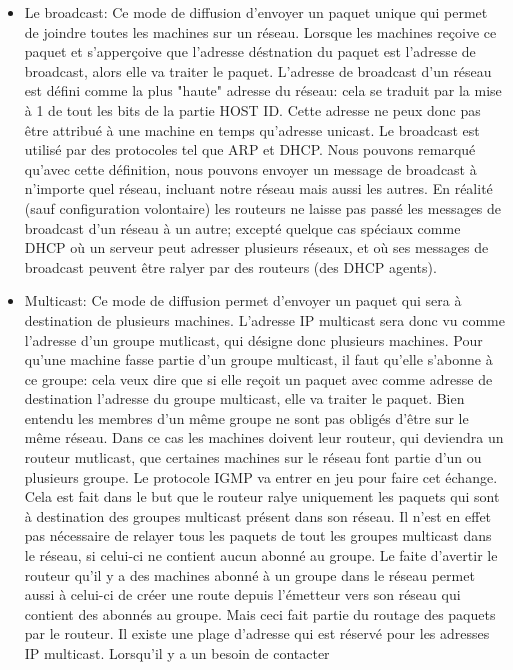 \begin{itemize}
\item Le broadcast: Ce mode de diffusion d'envoyer un paquet unique qui permet
de joindre toutes les machines sur un réseau. Lorsque les machines reçoive ce
paquet et s'apperçoive que l'adresse déstnation du paquet est l'adresse de
broadcast, alors elle va traiter le paquet. L'adresse de broadcast d'un réseau
est défini comme la plus "haute" adresse du réseau: cela se traduit par la mise
à 1 de tout les bits de la partie HOST ID. Cette adresse ne peux donc pas être
attribué à une machine en temps qu'adresse unicast.  Le broadcast est utilisé
par des protocoles tel que ARP et DHCP.  Nous pouvons remarqué qu'avec cette
définition, nous pouvons envoyer un message de broadcast à n'importe quel
réseau, incluant notre réseau mais aussi les autres. En réalité (sauf
configuration volontaire) les routeurs ne laisse pas passé les messages de
broadcast d'un réseau à un autre; excepté quelque cas spéciaux comme DHCP où un
serveur peut adresser plusieurs réseaux, et où ses messages de broadcast
peuvent être ralyer par des routeurs (des DHCP agents).
\item Multicast: Ce mode de diffusion permet d'envoyer un paquet qui sera à destination
de plusieurs machines. L'adresse IP multicast sera donc vu comme l'adresse d'un groupe
mutlicast, qui désigne donc plusieurs machines. Pour qu'une machine fasse partie d'un
groupe multicast, il faut qu'elle s'abonne à ce groupe: cela veux dire que si elle reçoit
un paquet avec comme adresse de destination l'adresse du groupe multicast, elle va traiter
le paquet.
Bien entendu les membres d'un même groupe ne sont pas obligés d'être sur le même réseau. Dans ce
cas les machines doivent leur routeur, qui deviendra un routeur mutlicast, que certaines machines sur
le réseau font partie d'un ou plusieurs groupe. Le protocole IGMP va entrer en jeu pour faire cet échange.
Cela est fait dans le but que le routeur ralye uniquement les paquets qui sont à destination des groupes
multicast  présent dans son réseau. Il n'est en effet pas nécessaire de relayer tous les paquets de tout les groupes
multicast dans le réseau, si celui-ci ne contient aucun abonné au groupe.
Le faite d'avertir le routeur qu'il y a des machines abonné à un groupe dans le réseau permet aussi à celui-ci
de créer une route depuis l'émetteur vers son réseau qui contient des abonnés au groupe. Mais ceci fait partie du
routage des paquets par le routeur.
Il existe une plage d'adresse qui est réservé pour les adresses IP multicast. Lorsqu'il y a un besoin de contacter

\end{itemize}
